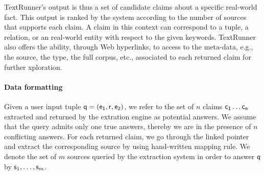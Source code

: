 TextRunner's output is thus a set of candidate claims about a specific real-world fact.
This output is ranked by the system according to the number of sources that supports each
claim. A claim in this context can correspond to a tuple, a relation, or an real-world entity 
with respect to the given keywords. TextRunner also offers the ability, through Web hyperlinks, 
to access to the meta-data, e.g., the source, the type, the full corpus, etc., associated to each 
returned claim for further xploration. 

\paragraph*{Data formatting}
Given a user input tuple $\mathsf{q}=(\mathsf{e_{1}}, \mathsf{r}_{},\mathsf{e_{2}})$, we refer to the
set of $n$ claims $\mathsf{c_{1}}\ldots \mathsf{c_{n}}$ extracted and returned by the
extration engine as potential answers. 
We assume that the query admits only one true answers, thereby we are in the presence of
$n$ conflicting answers. For each returned claim, we go through the linked pointer and extract the
corresponding source by using hand-written mapping rule. We denote the set of $m$ sources queried by 
the extraction system in order to answer $\mathsf{q}$ by $\mathsf{s}_{1}, \ldots, \mathsf{s}_{m}$.
